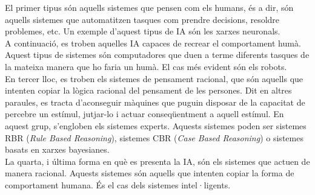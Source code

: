 \documentclass[a4paper,12pt]{article}
\begin{document}
El primer tipus són aquells sistemes que pensen com els humans, és a dir, són aquells sistemes que automatitzen tasques com prendre decisions, resoldre problemes, etc. Un exemple d'aquest tipus de IA són les xarxes neuronals.\\
A continuació, es troben aquelles IA capaces de recrear el comportament humà. Aquest tipus de sistemes són computadores que duen a terme diferents tasques de la mateixa manera que ho faria un humà. El cas més evident són els robots.\\
En tercer lloc, es troben els sistemes de pensament racional, que són aquells que intenten copiar la lògica racional del pensament de les persones. Dit en altres paraules, es tracta d'aconseguir màquines que puguin disposar de la capacitat de percebre un estímul, jutjar-lo i actuar conseqüentment a aquell estímul. En aquest grup, s'engloben els sistemes experts. Aquests sistemes poden ser sistemes RBR (\textit{Rule Based Reasoning}), sistemes CBR (\textit{Case Based Reasoning}) o sistemes basats en xarxes bayesianes.\\
La quarta, i última forma en què es presenta la IA, són els sistemes que actuen de manera racional. Aquests sistemes són aquells que intenten copiar la forma de comportament humana. És el cas dels sistemes intel·ligents.
\end{document}
